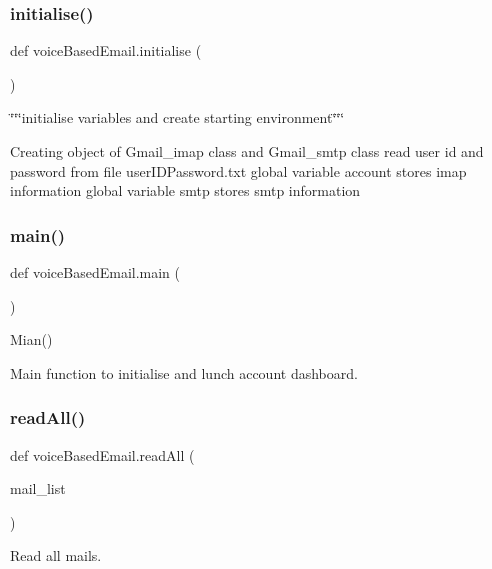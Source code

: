 \subsubsection{\texorpdfstring{initialise()}{initialise()}}
{\footnotesize\ttfamily def voice\+Based\+Email.\+initialise (\begin{DoxyParamCaption}{ }\end{DoxyParamCaption})}



\char`\"{}\char`\"{}\char`\"{}initialise  variables and create starting environment\char`\"{}\char`\"{}\char`\"{} 

Creating object of Gmail\+\_\+imap class and Gmail\+\_\+smtp class read user id and password from file user\+I\+D\+Password.\+txt global variable account stores imap information global variable smtp stores smtp information \mbox{\label{namespacevoiceBasedEmail_acdfa4990ff348bcc34fd0d6f74380fd6}} 
\subsubsection{\texorpdfstring{main()}{main()}}
{\footnotesize\ttfamily def voice\+Based\+Email.\+main (\begin{DoxyParamCaption}{ }\end{DoxyParamCaption})}



Mian() 

Main function to initialise and lunch account dashboard. \mbox{\label{namespacevoiceBasedEmail_a15c38e2e034d72a5ac7cbae407bfee32}} 
\subsubsection{\texorpdfstring{read\+All()}{readAll()}}
{\footnotesize\ttfamily def voice\+Based\+Email.\+read\+All (\begin{DoxyParamCaption}\item[{}]{mail\+\_\+list }\end{DoxyParamCaption})}



Read all mails. 

